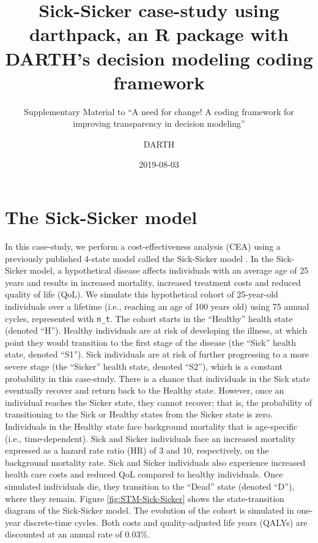 \documentclass[]{book}
\title{Sick-Sicker case-study using darthpack, an R package with DARTH's
decision modeling coding framework}
\subtitle{Supplementary Material to ``A need for change! A coding framework for
improving transparency in decision modeling''}
\author{DARTH}
\date{2019-08-03}
\begin{document}
\maketitle

{
\setcounter{tocdepth}{1}
\tableofcontents
}
\chapter*{The Sick-Sicker model}\label{the-sick-sicker-model}

In this case-study, we perform a cost-effectiveness analysis (CEA) using
a previously published 4-state model called the Sick-Sicker model
\citep{Enns2015}. In the Sick-Sicker model, a hypothetical disease
affects individuals with an average age of 25 years and results in
increased mortality, increased treatment costs and reduced quality of
life (QoL). We simulate this hypothetical cohort of 25-year-old
individuals over a lifetime (i.e., reaching an age of 100 years old)
using 75 annual cycles, represented with \texttt{n\_t}. The cohort
starts in the ``Healthy'' health state (denoted ``H''). Healthy
individuals are at risk of developing the illness, at which point they
would transition to the first stage of the disease (the ``Sick'' health
state, denoted ``S1''). Sick individuals are at risk of further
progressing to a more severe stage (the ``Sicker'' health state, denoted
``S2''), which is a constant probability in this case-study. There is a
chance that individuals in the Sick state eventually recover and return
back to the Healthy state. However, once an individual reaches the
Sicker state, they cannot recover; that is, the probability of
transitioning to the Sick or Healthy states from the Sicker state is
zero. Individuals in the Healthy state face background mortality that is
age-specific (i.e., time-dependent). Sick and Sicker individuals face an
increased mortality expressed as a hazard rate ratio (HR) of 3 and 10,
respectively, on the background mortality rate. Sick and Sicker
individuals also experience increased health care costs and reduced QoL
compared to healthy individuals. Once simulated individuals die, they
transition to the ``Dead'' state (denoted ``D''), where they remain.
Figure \ref{fig:STM-Sick-Sicker} shows the state-transition diagram of
the Sick-Sicker model. The evolution of the cohort is simulated in
one-year discrete-time cycles. Both costs and quality-adjusted life
years (QALYs) are discounted at an annual rate of 0.03\%.
\end{document}
